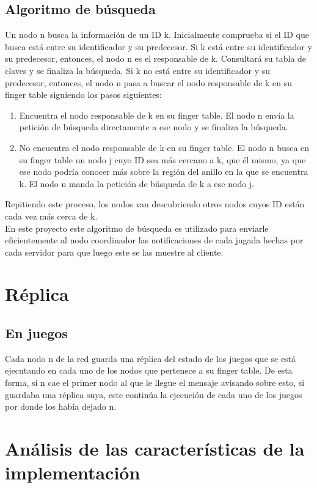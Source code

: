 \documentclass[10pt, a4paper]{article}
\begin{document}
    \subsection{Algoritmo de búsqueda}
    Un nodo n busca la información de un ID k. Inicialmente comprueba si el ID que busca está entre su identificador y su predecesor. Si k está entre su identificador y su predecesor, entonces, el nodo n es el responsable de k. Consultar\'a su tabla de claves y se finaliza la búsqueda. Si k no está entre su identificador y su predecesor, entonces, el nodo n pasa a buscar el nodo responsable de k en su finger table siguiendo los pasos siguientes: 
    \begin{enumerate}
    	 \item Encuentra el nodo responsable de k en su finger table. El nodo n envía la petición de búsqueda directamente a ese nodo y se finaliza la búsqueda.
    	 \item No encuentra el nodo responsable de k en su finger table. El nodo n busca en su finger table un nodo j cuyo ID sea más cercano a k, que él mismo, ya que ese nodo podr\'ia conocer más sobre la región del anillo en la que se encuentra k. El nodo n manda la petición de búsqueda de k a ese nodo j.
    \end{enumerate} 
    Repitiendo este proceso, los nodos van descubriendo otros nodos cuyos ID están cada vez más cerca de k.\\
    En este proyecto este algoritmo de búsqueda es utilizado para enviarle eficientemente al nodo coordinador las notificaciones de cada jugada hechas por cada servidor para que luego este se las muestre al cliente. \\
    
    \section{R\'eplica}
    \subsection{En juegos}
    Cada nodo n de la red guarda una réplica del estado de los juegos que se está ejecutando en cada uno de los nodos que pertenece a su finger table. De esta forma, si n cae el primer nodo al que le llegue el mensaje avisando sobre esto, si guardaba una réplica suya, este continúa la ejecución de cada uno de los juegos por donde los había dejado n.\\
    
    \section{An\'alisis de las caracter\'isticas de la implementaci\'on}
    
\end{document}

